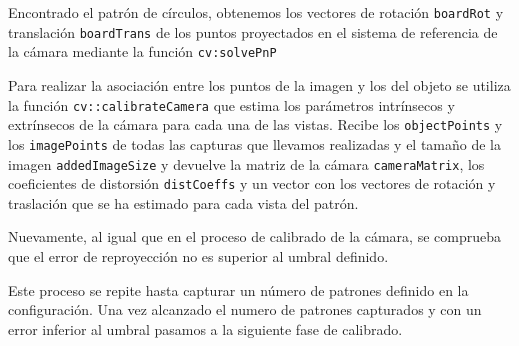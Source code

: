 Encontrado el patrón de círculos, obtenemos los vectores de rotación \texttt{boardRot} y translación \texttt{boardTrans} de los puntos proyectados en el sistema de referencia de la cámara mediante la función \texttt{cv:solvePnP}



Para realizar la asociación entre los puntos de la imagen y los del objeto se utiliza la función \texttt{cv::calibrateCamera} que estima los parámetros intrínsecos y extrínsecos de la cámara para cada una de las vistas. Recibe los \texttt{objectPoints} y los \texttt{imagePoints} de todas las capturas que llevamos realizadas y el tamaño de la imagen \texttt{addedImageSize} y devuelve la matriz de la cámara \texttt{cameraMatrix}, los coeficientes de distorsión \texttt{distCoeffs} y un vector con los vectores de rotación y traslación que se ha estimado para cada vista del patrón. 



Nuevamente, al igual que en el proceso de calibrado de la cámara, se comprueba que el error de reproyección no es superior al umbral definido.

Este proceso se repite hasta capturar un número de patrones definido en la configuración. Una vez alcanzado el numero de patrones capturados y con un error inferior al umbral pasamos a la siguiente fase de calibrado.

